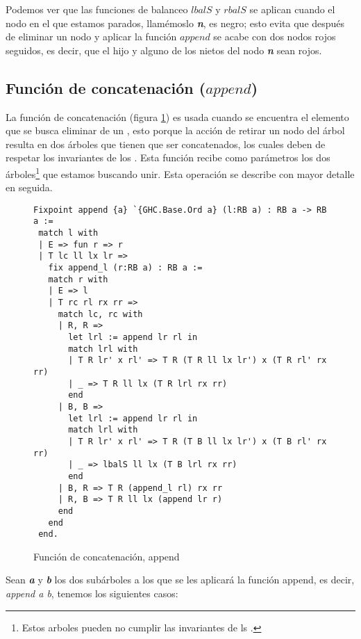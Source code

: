 Podemos ver que las funciones de balanceo $lbalS$ y $rbalS$ se aplican cuando el nodo en el que
estamos parados, llamémoslo \textbf{\textit{n}}, es negro; esto evita que después de eliminar un 
nodo y aplicar la funci\'on $append$ se acabe con dos nodos rojos seguidos, es decir, que el hijo y 
alguno de los nietos del nodo \textbf{\textit{n}} sean rojos.

\subsection{Funci\'on de concatenaci\'on ($append$)}

La funci\'on de concatenación (figura \ref{func_app}) es usada cuando se encuentra el elemento que
se busca eliminar de un {\arn}, esto porque la acci\'on de retirar un nodo del \'arbol resulta
en dos \'arboles que tienen que ser concatenados, los cuales deben de respetar los invariantes de
los {\arns}. Esta funci\'on recibe como parámetros los dos \'arboles\footnote{Estos arboles pueden
no cumplir las invariantes de ls {\arns}.} que estamos buscando unir. Esta operación se describe
con mayor detalle en seguida.

\begin{figure}
\centering
\captionsetup{justification=centering}
\begin{verbatim}
Fixpoint append {a} `{GHC.Base.Ord a} (l:RB a) : RB a -> RB a :=
 match l with
 | E => fun r => r
 | T lc ll lx lr =>
   fix append_l (r:RB a) : RB a :=
   match r with
   | E => l
   | T rc rl rx rr =>
     match lc, rc with
     | R, R =>
       let lrl := append lr rl in
       match lrl with
       | T R lr' x rl' => T R (T R ll lx lr') x (T R rl' rx rr)
       | _ => T R ll lx (T R lrl rx rr)
       end
     | B, B =>
       let lrl := append lr rl in
       match lrl with
       | T R lr' x rl' => T R (T B ll lx lr') x (T B rl' rx rr)
       | _ => lbalS ll lx (T B lrl rx rr)
       end
     | B, R => T R (append_l rl) rx rr
     | R, B => T R ll lx (append lr r)
     end
   end
 end.
\end{verbatim}
\caption{Funci\'on de concatenaci\'on, append}
\label{func_app}
\end{figure}


Sean \textbf{\textit{a}} y \textbf{\textit{b}} los dos subárboles a los que se les aplicar\'a la 
funci\'on append, es decir, \textit{append a b}, tenemos los siguientes casos:

